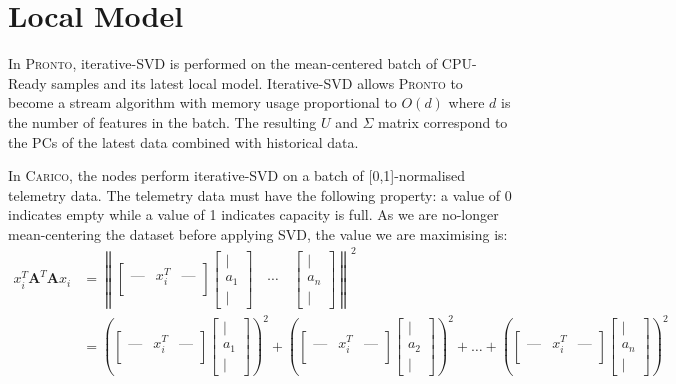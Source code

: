 \section{Local Model}
\label{sec:local-model-construction}
In \textsc{Pronto}, iterative-SVD is performed on the mean-centered batch of CPU-Ready
samples and its latest local model. Iterative-SVD allows \textsc{Pronto} to become a
stream algorithm with memory usage proportional to $O(d)$ where $d$ is the
number of features in the batch. The resulting $U$ and $\Sigma$ matrix
correspond to the PCs of the latest data combined with historical data.

In \textsc{Carico}, the nodes perform iterative-SVD on a batch of [0,1]-normalised
telemetry data. The telemetry data must have the following property: a value of
0 indicates empty while a value of 1 indicates capacity is full. As we are
no-longer mean-centering the dataset before applying SVD, the value we are
maximising is:
\begin{align}
x_i^T \mathbf{A}^T \mathbf{A} x_i &= \left\| \begin{bmatrix}
\text{---} & x_i^T & \text{---} \\
\end{bmatrix}
\begin{bmatrix}
| \\
a_1 \\
|
\end{bmatrix} \quad \cdots \quad
\begin{bmatrix}
| \\
a_n \\
|
\end{bmatrix} \right\|^2 \\
&= \left( \begin{bmatrix}
\text{---} & x_i^T & \text{---} \\
\end{bmatrix}
\begin{bmatrix}
| \\
a_1 \\
|
\end{bmatrix} \right)^2 + \left( \begin{bmatrix}
\text{---} & x_i^T & \text{---} \\
\end{bmatrix}
\begin{bmatrix}
| \\
a_2 \\
|
\end{bmatrix} \right)^2 + \dots + \left( \begin{bmatrix}
\text{---} & x_i^T & \text{---} \\
\end{bmatrix}
\begin{bmatrix}
| \\
a_n \\
|
\end{bmatrix} \right)^2
\end{align}


